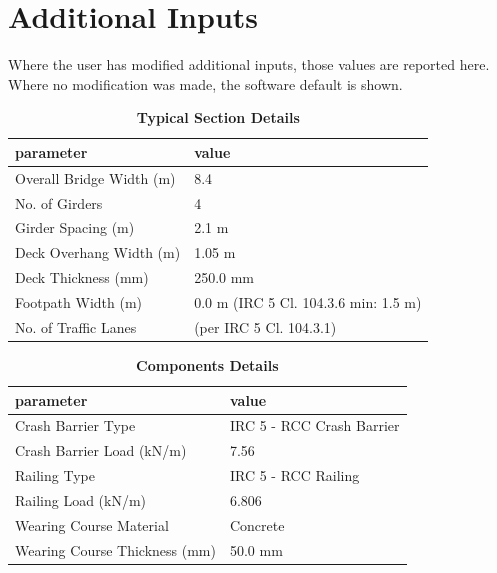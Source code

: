 \documentclass[12pt,a4paper]{report}
\numberwithin{table}{chapter}
\numberwithin{figure}{chapter}
\begin{document}
\newpage
\section{Additional Inputs}
\label{sec:additional-inputs}

Where the user has modified additional inputs, those values are reported here. Where no modification was made, the software default is shown.

\vspace{0.8cm}

\begin{longtable}{|L{5.5cm}|p{10.0cm}|}
\caption{\textbf{Typical Section Details}}
\hline
\textbf{parameter} & \textbf{value} \\
\hline
\textnormal{Overall Bridge Width (m)} & 8.4 \\[6pt]
\hline
\textnormal{No. of Girders} & 4 \\[6pt]
\hline
\textnormal{Girder Spacing (m)} & 2.1 m \\[6pt]
\hline
\textnormal{Deck Overhang Width (m)} & 1.05 m \\[6pt]
\hline
\textnormal{Deck Thickness (mm)} & 250.0 mm \\[6pt]
\hline
\textnormal{Footpath Width (m)} & 0.0 m (IRC 5 Cl. 104.3.6 min: 1.5 m) \\[6pt]
\hline
\textnormal{No. of Traffic Lanes} &  (per IRC 5 Cl. 104.3.1) \\[6pt]
\hline
\end{longtable}

\vspace{0.8em}

\begin{longtable}{|L{5.5cm}|p{10.0cm}|}
\caption{\textbf{Components Details}}
\hline
\textbf{parameter} & \textbf{value} \\
\hline
\textnormal{Crash Barrier Type} & IRC 5 - RCC Crash Barrier \\[6pt]
\hline
\textnormal{Crash Barrier Load (kN/m)} & 7.56 \\[6pt]
\hline

\textnormal{Railing Type} & IRC 5 - RCC Railing \\[6pt]
\hline
\textnormal{Railing Load (kN/m)} & 6.806 \\[6pt]
\hline
\textnormal{Wearing Course Material} & Concrete \\[6pt]
\hline
\textnormal{Wearing Course Thickness (mm)} & 50.0 mm \\[6pt]
\hline
\end{longtable}
\end{document}
